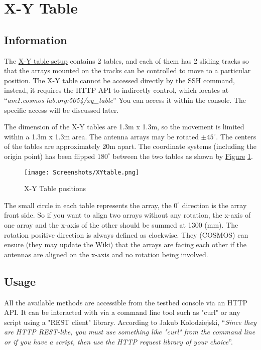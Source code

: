 \documentclass{article}
\begin{document}
    

    
    
    
    
\section{X-Y Table}
    \subsection{Information}
        The \href{https://wiki.cosmos-lab.org/wiki/Resources/Services/XYTable}{X-Y table setup} contains 2 tables, and each of them has 2 sliding tracks so that the arrays mounted on the tracks can be controlled to move to a particular position. The X-Y table cannot be accessed directly by the SSH command, instead, it requires the HTTP API to indirectly control, which locates at ``\emph{am1.cosmos-lab.org:5054/xy\_table}'' You can access it within the console. The specific access will be discussed later.  
        
        The dimension of the X-Y tables are 1.3m x 1.3m, so the movement is limited within a 1.3m x 1.3m area. The antenna arrays may be rotated $\pm45^\circ$. The centers of the tables are approximately 20m apart. The coordinate systems (including the origin point) has been flipped $180^\circ$ between the two tables as shown by \href{https://drive.google.com/file/d/1oGhTNy8XgbAVgezPOK04fDG4RUXeQpJS/view?usp=sharing}{Figure} \ref{fig: X-Y Table}. 
        \begin{figure}[ht]
            \centering
            \texttt{[image: Screenshots/XYtable.png]}
            \caption{X-Y Table positions}
            \vspace*{0mm}
            \label{fig: X-Y Table}
        \end{figure}
        
        The small circle in each table represents the array, the $0^\circ$ direction is the array front side. So if you want to align two arrays without any rotation, the x-axis of one array and the x-axis of the other should be summed at 1300 (mm). The rotation positive direction is always defined as clockwise. They (COSMOS) can ensure\cite{XYTable} (they may update the Wiki) that the arrays are facing each other if the antennas are aligned on the x-axis and no rotation being involved. 
        
    \subsection{Usage}
        All the available methods are accessible from the testbed console via an HTTP API. It can be interacted with via a command line tool such as "curl" or any script using a "REST client" library. According to Jakub Kolodziejski, ``\emph{Since they are HTTP REST-like, you must use something like "curl" from the command line or if you have a script, then use the HTTP request library of your choice}''. 
        
\end{document}
